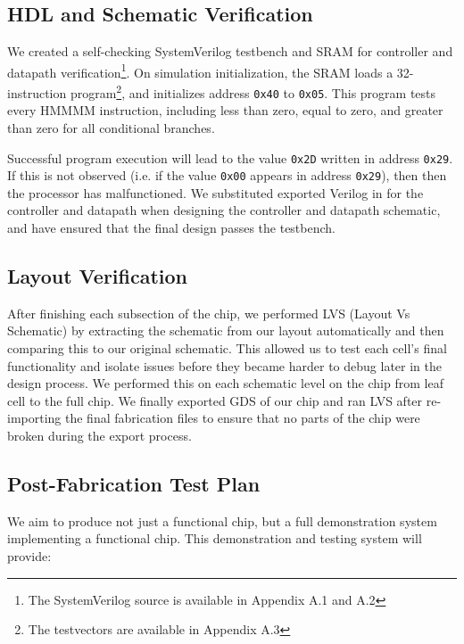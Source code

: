 \documentclass[12pt]{article}
\begin{document}
\subsection{HDL and Schematic Verification}

We created a self-checking SystemVerilog testbench and SRAM for controller and datapath verification\footnote{The SystemVerilog source is available in Appendix A.1 and A.2}. On simulation initialization, the SRAM loads a 32-instruction program\footnote{The testvectors are available in Appendix A.3}, and initializes address \texttt{0x40} to \texttt{0x05}. This program tests every HMMMM instruction, including less than zero, equal to zero, and greater than zero for all conditional branches.

Successful program execution will lead to the value \texttt{0x2D} written in address \texttt{0x29}. If this is not observed (i.e. if the value \texttt{0x00} appears in address \texttt{0x29}), then then the processor has malfunctioned. We substituted exported Verilog in for the controller and datapath when designing the controller and datapath schematic, and have ensured that the final design passes the testbench.


\subsection{Layout Verification}

After finishing each subsection of the chip, we performed LVS (Layout Vs Schematic) by extracting the schematic from our layout automatically and then comparing this to our original schematic. This allowed us to test each cell's final functionality and isolate issues before they became harder to debug later in the design process. We performed this on each schematic level on the chip from leaf cell to the full chip. We finally exported GDS of our chip and ran LVS after re-importing the final fabrication files to ensure that no parts of the chip were broken during the export process. 

\subsection{Post-Fabrication Test Plan}

We aim to produce not just a functional chip, but a full demonstration system implementing a functional chip. This demonstration and testing system will provide:
\end{document}
